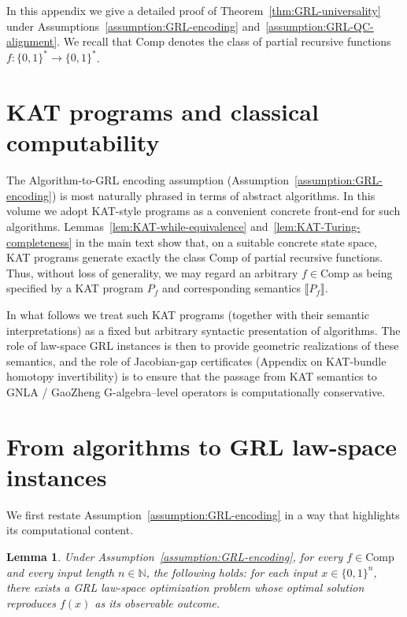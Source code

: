 \documentclass[11pt]{book}
\theoremstyle{plain}
\newtheorem{lemma}[theorem]{Lemma}
\theoremstyle{definition}
\theoremstyle{remark}
\begin{document}
In this appendix we give a detailed proof of
Theorem~\ref{thm:GRL-universality} under
Assumptions~\ref{assumption:GRL-encoding}
and~\ref{assumption:GRL-QC-alignment}. We recall that
$\mathrm{Comp}$ denotes the class of partial recursive functions
$f:\{0,1\}^\ast\to\{0,1\}^\ast$.

\section{KAT programs and classical computability}

The Algorithm-to-GRL encoding assumption
(Assumption~\ref{assumption:GRL-encoding}) is most naturally phrased in
terms of abstract algorithms. In this volume we adopt KAT-style
programs as a convenient concrete front-end for such algorithms.
Lemmas~\ref{lem:KAT-while-equivalence}
and~\ref{lem:KAT-Turing-completeness} in the main text show that, on a
suitable concrete state space, KAT programs generate exactly the class
$\mathrm{Comp}$ of partial recursive functions. Thus, without loss of
generality, we may regard an arbitrary $f\in\mathrm{Comp}$ as being
specified by a KAT program $P_f$ and corresponding semantics
$\llbracket P_f\rrbracket$.

In what follows we treat such KAT programs (together with their semantic
interpretations) as a fixed but arbitrary syntactic presentation of
algorithms. The role of law-space GRL instances is then to provide
geometric realizations of these semantics, and the role of Jacobian-gap
certificates (Appendix on KAT-bundle homotopy invertibility) is to
ensure that the passage from KAT semantics to GNLA / GaoZheng
G-algebra--level operators is computationally conservative.

\section{From algorithms to GRL law-space instances}

We first restate Assumption~\ref{assumption:GRL-encoding} in a way that
highlights its computational content.

\begin{lemma}\label{lem:alg-to-GRL}
Under Assumption~\ref{assumption:GRL-encoding}, for every
$f\in\mathrm{Comp}$ and every input length $n\in\mathbb{N}$, the
following holds: for each input $x\in\{0,1\}^n$, there exists a GRL
law-space optimization problem whose optimal solution reproduces
$f(x)$ as its observable outcome.
\end{lemma}
\end{document}
